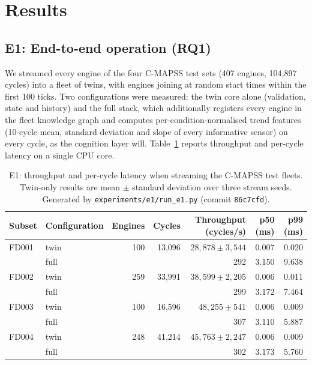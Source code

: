 \section{Results}
\label{sec:results}

\subsection{E1: End-to-end operation (RQ1)}
\label{sec:results-e1}

We streamed every engine of the four C-MAPSS test sets (407 engines, 104{,}897 cycles) into a
fleet of twins, with engines joining at random start times within the first 100 ticks. Two
configurations were measured: the twin core alone (validation, state and history) and the full
stack, which additionally registers every engine in the fleet knowledge graph and computes
per-condition-normalised trend features (10-cycle mean, standard deviation and slope of every
informative sensor) on every cycle, as the cognition layer will. Table~\ref{tab:e1} reports
throughput and per-cycle latency on a single CPU core.

\begin{table}[ht]
  \centering
  \caption{E1: throughput and per-cycle latency when streaming the C-MAPSS test fleets.
  Twin-only results are mean $\pm$ standard deviation over three stream seeds.
  Generated by \texttt{experiments/e1/run\_e1.py} (commit \texttt{86c7cfd}).}
  \label{tab:e1}
  \begin{tabular}{llrrrrr}
    \toprule
    Subset & Configuration & Engines & Cycles & Throughput (cycles/s) & p50 (ms) & p99 (ms) \\
    \midrule
    FD001 & twin & 100 & 13{,}096 & $28{,}878 \pm 3{,}544$ & 0.007 & 0.020 \\
          & full &     &          & 292                   & 3.150 & 9.638 \\
    FD002 & twin & 259 & 33{,}991 & $38{,}599 \pm 2{,}205$ & 0.006 & 0.011 \\
          & full &     &          & 299                   & 3.172 & 7.464 \\
    FD003 & twin & 100 & 16{,}596 & $48{,}255 \pm 541$     & 0.006 & 0.009 \\
          & full &     &          & 307                   & 3.110 & 5.887 \\
    FD004 & twin & 248 & 41{,}214 & $45{,}763 \pm 2{,}247$ & 0.006 & 0.009 \\
          & full &     &          & 302                   & 3.173 & 5.760 \\
    \bottomrule
  \end{tabular}
\end{table}

